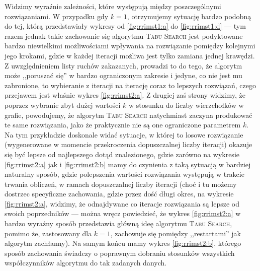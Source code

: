 Widzimy wyraźnie zależności, które występują między poszczególnymi rozwiązaniami. W przypadku gdy $k = 1$, otrzymujemy sytuację bardzo podobną do tej, którą przedstawiały wykresy od \ref{fig:rrimst1:a} do \ref{fig:rrimst1:d} --- tym razem jednak takie zachowanie się algorytmu \textsc{Tabu Search} jest podyktowane bardzo niewielkimi możliwościami wpływania na rozwiązanie pomiędzy kolejnymi jego krokami, gdzie w każdej iteracji możliwa jest tylko zamiana jednej krawędzi. Z uwzględnieniem listy ruchów zakazanych, prowadzi to do tego, że algorytm może ,,poruszać się'' w bardzo ograniczonym zakresie i jedyne, co nie jest mu zabronione, to wybieranie z iteracji na iterację coraz to lepszych rozwiązań, czego przejawem jest właśnie wykres \ref{fig:rrimst2:a}. Z drugiej zaś strony widzimy, że poprzez wybranie zbyt dużej wartości $k$ w stosunku do liczby wierzchołków w grafie, powodujemy, że algorytm \textsc{Tabu Search} natychmiast zaczyna produkować te same rozwiązania, jako że praktycznie nie są one ograniczone parametrem $k$. Na tym przykładzie doskonale widać sytuacje, w której to losowe rozwiązanie (wygenerowane w momencie przekroczenia dopuszczalnej liczby iteracji) okazuje się być lepsze od najlepszego dotąd znalezionego, gdzie zarówno na wykresie \ref{fig:rrimst2:a} jak i \ref{fig:rrimst2:b} mamy do czynienia z taką sytuacją w bardziej naturalny sposób, gdzie polepszenia wartości rozwiązania występują w trakcie trwania obliczeń, w ramach dopuszczalnej liczby iteracji (choć i tu możemy dostrzec specyficzne zachowania, gdzie przez dość długi okres, na wykresie \ref{fig:rrimst2:a}, widzimy, że odnajdywane co iteracje rozwiązania są lepsze od swoich poprzedników --- można wręcz powiedzieć, że wykres \ref{fig:rrimst2:a} w bardzo wyraźny sposób przedstawia główną ideę algorytmu \textsc{Tabu Search}, pomimo że, zastosowany dla $k = 1$, zachowuje się pomiędzy ,,restartami'' jak algorytm zachłanny). Na samym końcu mamy wykres \ref{fig:rrimst2:b}, którego sposób zachowania świadczy o poprawnym dobraniu stosunków wszystkich współczynników algorytmu do tak zadanych danych. 

